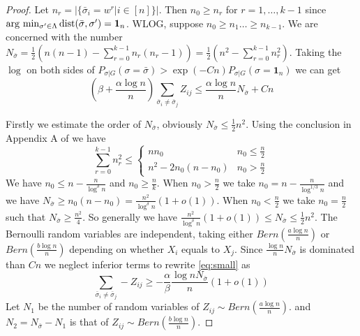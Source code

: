 \documentclass{article}
\begin{document}
\begin{proof}
	Let $n_r = |\{\bar{\sigma}_i = w^r | i\in [n] \}|$. Then $n_0 \geq n_r$ for $r=1, \dots, k-1$ since  $\arg\,\min_{\sigma'\in \Lambda} \operatorname{dist}(\bar{\sigma}, \sigma') = \mathbf{1}_n$.
	WLOG, suppose $n_0 \geq n_1 \dots \geq n_{k-1}$.
	We are concerned with the number $N_{\bar{\sigma}} = \frac{1}{2}(n(n-1) - \sum_{r=0}^{k-1} n_r(n_r-1))
	=\frac{1}{2}(n^2 - \sum_{r=0}^{k-1} n_r^2)$.
	Taking the $\log$ on both sides of $P_{\sigma | G}(\sigma = \bar{\sigma} ) > \exp(-Cn) P_{\sigma | G}(\sigma = \mathbf{1}_n)$ we can get
	\begin{equation}\label{eq:small}
	(\beta + \frac{\alpha \log n}{n}) \sum_{\bar{\sigma}_i  \neq \bar{\sigma}_j} Z_{ij} \leq \frac{\alpha \log n}{n} N_{\bar{\sigma}} + C n
	\end{equation}
	
	Firstly we estimate the order of $N_{\bar{\sigma}}$, obviously $N_{\bar{\sigma}} \leq \frac{1}{2} n^2$.
	Using the conclusion in Appendix A of \cite{chen2016information} we have
	\begin{equation}
	\sum_{r=0}^{k-1} n_r^2 \leq
	\begin{cases}
	n n_0 & n_0 \leq \frac{n}{2} \\
	n^2 - 2n_0(n-n_0) & n_0 > \frac{n}{2}
	\end{cases}
	\end{equation}
	We have $n_0 \leq n - \frac{n}{\log^{\delta} n}$ and $n_0 \geq \frac{n}{k}$. When $n_0 > \frac{n}{2}$ we take $n_0 = n - \frac{n}{\log^{1/3} n}$
	and we have $N_{\bar{\sigma}} \geq n_0 (n - n_0) = \frac{n^2}{\log^{\delta} n}(1+o(1))$. When $n_0 < \frac{n}{2}$ we take $n_0 = \frac{n}{2}$ such that
	$N_{\bar{\sigma}} \geq \frac{n^2}{4}$. So generally we have $\frac{n^2}{\log^{\delta} n}(1+o(1)) \leq N_{\bar{\sigma}} \leq \frac{1}{2}n^2$.
	The Bernoulli random variables are independent, taking either $Bern(\frac{a\log n}{n})$ or $Bern(\frac{b \log n}{n})$ depending on whether
	$X_i$ equals to $X_j$.
	Since $\frac{\log n}{n} N_{\bar{\sigma}}$ is dominated than $Cn$ we neglect inferior terms to rewrite \eqref{eq:small} as
	\begin{equation}
	\sum_{ \bar{\sigma}_i  \neq \bar{\sigma}_j } -Z_{ij} \geq -\frac{\alpha}{\beta}\frac{\log n N_{\bar{\sigma}}}{n}(1+o(1))
	\end{equation}
	Let $N_1$ be the number of random variables of $Z_{ij} \sim Bern(\frac{a\log n}{n})$.
	and $N_2 = N_{\bar{\sigma}} - N_1$ is that of $Z_{ij} \sim Bern(\frac{b\log n}{n})$.
	

\end{proof}
\end{document}

